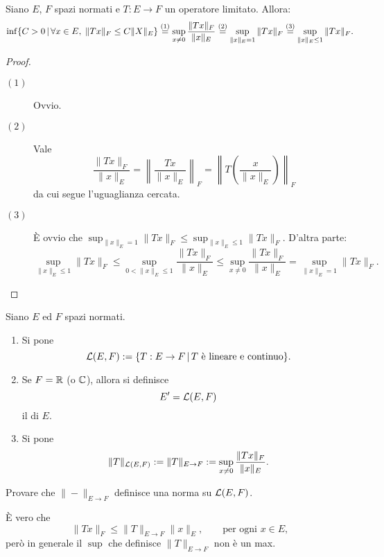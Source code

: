 \begin{lemma}
	Siano $E$, $F$ spazi normati e $T:E \to F$ un operatore limitato. Allora:
	$$
		\inf\{C > 0 \,|\, \forall x \in E,\; \|Tx\|_F \leq C\|X\|_E \} \overset{(1)}= \sup_{x \neq 0} \frac{\|Tx\|_F}{\|x\|_E} \overset{(2)}= \sup_{\|x\|_E=1} \|Tx\|_F \overset{(3)}= \sup_{\|x\|_E \leq 1} \|Tx\|_F.
	$$
\end{lemma}
\begin{proof}
	\leavevmode
	\begin{description}
		\item[$(1)$] Ovvio.
		\item[$(2)$] Vale
		$$
			\frac{\|Tx\|_F}{\|x\|_E} = \left\| \frac{Tx}{\|x\|_E} \right\|_F = \left\|T\left(\frac{x}{\|x\|_E}\right)\right\|_F
		$$
		da cui segue l'uguaglianza cercata.
		\item[$(3)$] È ovvio che $\sup_{\|x\|_E=1} \|Tx\|_F \leq \sup_{\|x\|_E \leq 1} \|Tx\|_F$. D'altra parte:
		$$
			\sup_{\|x\|_E \leq 1} \|Tx\|_F \leq \sup_{0 < \|x\|_E \leq 1} \frac{\|Tx\|_F}{\|x\|_E} \leq  \sup_{x \neq 0} \frac{\|Tx\|_F}{\|x\|_E} = \sup_{\|x\|_E = 1} \|Tx\|_F.
		$$
	\end{description}
\end{proof}

\begin{definition}
	Siano $E$ ed $F$ spazi normati.
	\begin{enumerate}
		\item Si pone
		$$
			\mathcal{L}(E, F) := \{ T:E \to F \,|\, \text{$T$ è lineare e continuo}\}.
		$$
		\item Se $F=\mathbb{R}$ (o $\mathbb{C}$), allora si definisce
		$$
			E' = \mathcal{L}(E, F)
		$$
		il  di $E$.
		\item Si pone
		$$
			\|T\|_{\mathcal{L}(E,F)} := \|T\|_{E \to F} := \sup_{x \neq 0} \frac{\|Tx\|_F}{\|x\|_E}.
		$$
	\end{enumerate}
\end{definition}

\begin{exercise}
	Provare che $\|-\|_{E \to F}$ definisce una norma su $\mathcal{L}(E,F)$.
\end{exercise}

\begin{remark}
	È vero che
	$$
		\|Tx\|_F \leq \|T\|_{E \to F} \|x\|_E, \qquad \text{per ogni $x \in E$},
	$$
	però in generale il $\sup$ che definisce $\|T\|_{E \to F}$ non è un max.
\end{remark}

